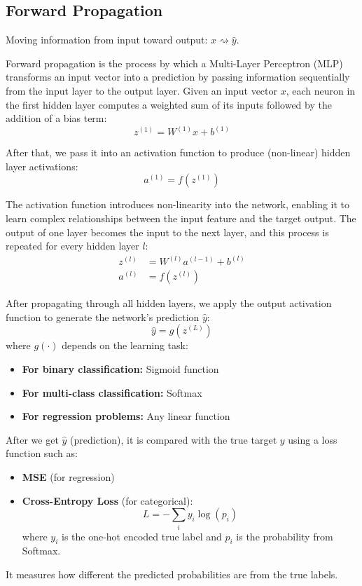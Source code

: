 \subsection{Forward Propagation}

Moving information from input toward output: $x \rightsquigarrow \hat{y}$.

Forward propagation is the process by which a Multi-Layer Perceptron (MLP) transforms an input vector into a prediction by passing information sequentially from the input layer to the output layer. Given an input vector $x$, each neuron in the first hidden layer computes a weighted sum of its inputs followed by the addition of a bias term:
\begin{equation}
z^{(1)} = W^{(1)} x + b^{(1)}
\end{equation}

After that, we pass it into an activation function to produce (non-linear) hidden layer activations:
\begin{equation}
a^{(1)} = f\left(z^{(1)}\right)
\end{equation}

The activation function introduces non-linearity into the network, enabling it to learn complex relationships between the input feature and the target output. The output of one layer becomes the input to the next layer, and this process is repeated for every hidden layer $l$:
\begin{align}
z^{(l)} &= W^{(l)} a^{(l-1)} + b^{(l)} \\
a^{(l)} &= f\left(z^{(l)}\right)
\end{align}

After propagating through all hidden layers, we apply the output activation function to generate the network's prediction $\hat{y}$:
\begin{equation}
\hat{y} = g\left(z^{(L)}\right)
\end{equation}
where $g(\cdot)$ depends on the learning task:
\begin{itemize}
    \item \textbf{For binary classification:} Sigmoid function
    \item \textbf{For multi-class classification:} Softmax
    \item \textbf{For regression problems:} Any linear function
\end{itemize}

After we get $\hat{y}$ (prediction), it is compared with the true target $y$ using a loss function such as:
\begin{itemize}
    \item \textbf{MSE} (for regression)
    \item \textbf{Cross-Entropy Loss} (for categorical):
    \begin{equation}
    L = -\sum_{i} y_i \log(p_i)
    \end{equation}
    where $y_i$ is the one-hot encoded true label and $p_i$ is the probability from Softmax.
\end{itemize}
It measures how different the predicted probabilities are from the true labels.

